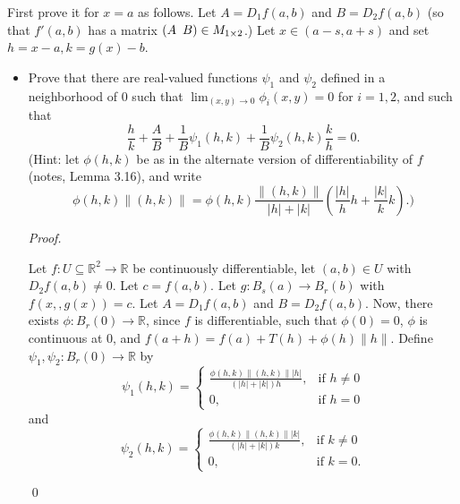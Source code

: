 \documentclass[12pt]{article}
\newenvironment{problem}[2][Problem]{\begin{trivlist}
\item[\hskip \labelsep {\bfseries #1}\hskip \labelsep {\bfseries #2.}]}{\end{trivlist}}
\newenvironment{sol}
    {\emph{Proof.}
    }
    {
    \qed
    }
\begin{document}
\begin{problem}{21}
First prove it for $x = a$ as follows. Let $A = D_1f(a,b)$ and $B = D_2f(a,b)$ (so that $f'(a,b)$ has a matrix $(A \hspace{.5em} B) \in M_{1 \times 2}$.) Let $x \in (a-s,a+s)$ and set $h = x-a,k = g(x)-b$.

\begin{itemize}
    \item[(a)] Prove that there are real-valued functions $\psi_1$ and $\psi_2$ defined in a neighborhood of 0 such that $\lim_{(x,y)\to 0}\phi_i(x,y) = 0$ for $i = 1,2$, and such that $$\frac{h}{k} + \frac{A}{B} + \frac{1}{B}\psi_1(h,k) + \frac{1}{B}\psi_2(h,k)\frac{k}{h} = 0.$$ (Hint: let $\phi(h,k)$ be as in the alternate version of differentiability of $f$ (notes, Lemma 3.16), and write $$\phi(h,k)\lVert (h,k) \rVert = \phi(h,k) \frac{\lVert (h,k) \rVert}{\left| h \right| + \left| k \right|} \left( \frac{\left| h \right|}{h}h + \frac{\left| k \right|}{k}k  \right).)$$
    
    \begin{sol}
    Let $f : U \subseteq \mathbb{R}^2 \to \mathbb{R}$ be continuously differentiable, let $(a,b) \in U$ with $D_2f(a,b) \neq 0$. Let $c = f(a,b)$. Let $g : B_s(a) \to B_r(b)$ with $f(x,,g(x)) = c$. Let $A = D_1f(a,b)$ and $B = D_2f(a,b)$. Now, there exists $\phi : B_r(0) \to \mathbb{R}$, since $f$ is differentiable, such that $\phi(0) = 0$, $\phi$ is continuous at 0, and $f(a+h) = f(a) + T(h) + \phi(h)\lVert h \rVert$. Define $\psi_1,\psi_2 : B_r(0) \to \mathbb{R}$ by $$\psi_1(h,k) = \begin{cases} 
      \frac{\phi(h,k) \lVert (h,k) \rVert \left| h \right|}{(\left| h \right| + \left| k \right| )h}, & \text{if } h \neq 0 \\
      0, & \text{if } h = 0
   \end{cases}$$
   and $$\psi_2(h,k) = \begin{cases} 
      \frac{\phi(h,k) \lVert (h,k) \rVert \left| k \right|}{(\left| h \right| + \left| k \right| )k}, & \text{if } k \neq 0 \\
      0, & \text{if } k = 0.
   \end{cases}$$
   

\end{sol}
\end{itemize}
\end{problem}
\end{document}
